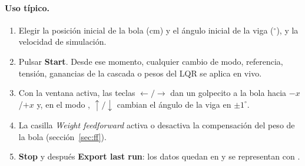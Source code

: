 \paragraph{Uso típico.}
\begin{enumerate}
  \item Elegir la posición inicial de la bola (cm) y el ángulo inicial de la viga ($^\circ$), y la velocidad de simulación.
  \item Pulsar \textbf{Start}. Desde ese momento, cualquier cambio de modo, referencia, tensión, ganancias de la cascada o pesos del LQR se aplica en vivo.
  \item Con la ventana activa, las teclas $\leftarrow/\rightarrow$ dan un golpecito a la bola hacia $-x$/$+x$ y, en el modo , $\uparrow/\downarrow$ cambian el ángulo de la viga en $\pm1^\circ$.
  \item La casilla \emph{Weight feedforward} activa o desactiva la compensación del peso de la bola (sección~\ref{sec:ff}).
  \item \textbf{Stop} y después \textbf{Export last run}: los datos quedan en  y se representan con .
\end{enumerate}
